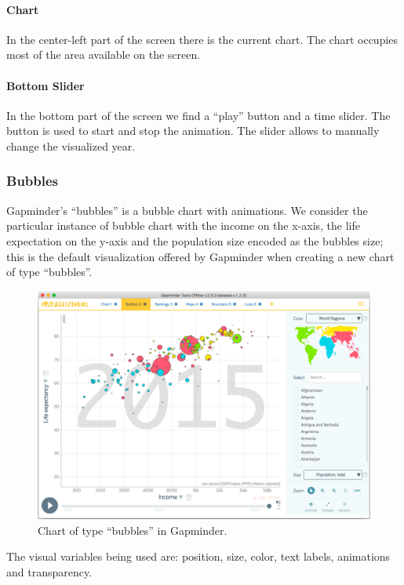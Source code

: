 \paragraph{Chart}
In the center-left part of the screen there is the current chart.
The chart occupies most of the area available on the screen.

\paragraph{Bottom Slider}
In the bottom part of the screen we find a ``play'' button and a time slider.
The button is used to start and stop the animation.
The slider allows to manually change the visualized year.


\subsubsection{Bubbles}
\label{subsubsec:bubbles}
Gapminder's ``bubbles'' is a bubble chart with animations.
We consider the particular instance of bubble chart with the income on the x-axis, the life expectation on the y-axis and the population size encoded as the bubbles size; this is the default visualization offered by Gapminder when creating a new chart of type ``bubbles''.

\begin{figure}[h]
	\centering
	\includegraphics[width=0.95\columnwidth]{figures/bubbles}
	\caption{Chart of type ``bubbles'' in Gapminder.}
	\label{fig:bubbles}
\end{figure}

The visual variables being used are: position, size, color, text labels, animations and transparency.

